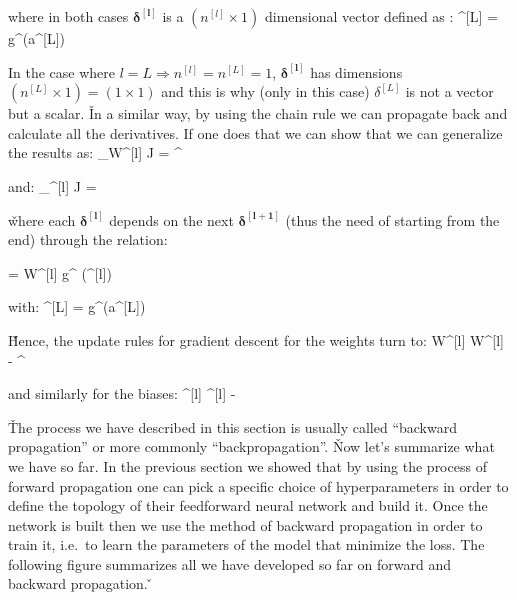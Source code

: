\vspace{-10pt}

where in both cases $\boldsymbol{\delta^{[l]}}$ is a $(n^{[l]} \times 1)$ dimensional vector defined as :
\bse
\delta^{[L]} =  \cdot g^\prime (a^{[L]})
\ese

In the case where $l = L \Rightarrow n^{[l]} = n^{[L]} = 1$, $\boldsymbol{\delta^{[l]}}$ has dimensions $(n^{[L]}
\times 1) = (1 \times 1)$ and this is why (only in this case) $\delta^{[L]}$ is not a vector but a scalar. \v

In a similar way, by using the chain rule we can propagate back and calculate all the derivatives. If one does that
we can show that we can generalize the results as:
\bse
\nabla_{W^{[l]}} J =\boldsymbol{\delta^{[l]}} ^{\intercal}
\ese

and:
\bse
\nabla_{^{[l]}} J = \boldsymbol{\delta^{[l]}}
\ese

\v

where each $\boldsymbol{\delta^{[l]}}$ depends on the next $\boldsymbol{\delta^{[l+1]}}$ (thus the need of starting
from the end) through the relation:

\bse
\boldsymbol{\delta^{[l]}} = \boldsymbol{\delta^{[l+1]}} \cdot W^{[l]} \cdot g^{\prime} ({}^{[l]})
\ese

with:
\bse
\delta^{[L]} =  \cdot g^\prime (a^{[L]})
\ese

\v

Hence, the update rules for gradient descent for the weights turn to:
\bse
W^{[l]} \coloneqq W^{[l]} - \alpha \cdot\boldsymbol{\delta^{[l]}} ^{\intercal}
\ese

and similarly for the biases:
\bse
{}^{[l]} \coloneqq {}^{[l]} -\alpha \cdot\boldsymbol{\delta^{[l]}}
\ese

\v

The process we have described in this section is usually called ``backward propagation'' or more commonly
``backpropagation''. \v

Now let's summarize what we have so far. In the previous section we showed that by using the process of forward
propagation one can pick a specific choice of hyperparameters in order to define the topology of their feedforward
neural network and build it. Once the network is built then we use the method of backward propagation in order to
train it, i.e.\ to learn the parameters of the model that minimize the loss. The following figure summarizes all we
have developed so far on forward and backward propagation. \v

